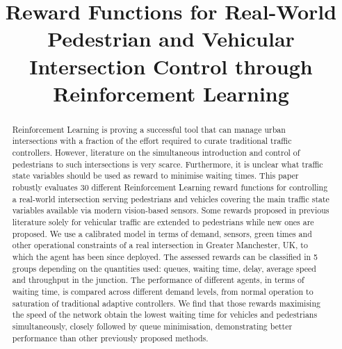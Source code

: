 \documentclass[a4paper, conference]{IEEEtran}
\begin{document}
\title{Reward Functions for Real-World Pedestrian and Vehicular Intersection Control through Reinforcement Learning}

\author{
\and
{}
}

\maketitle

\begin{abstract}
Reinforcement Learning is proving a successful tool that can manage urban intersections with a fraction of the effort required to curate traditional traffic controllers.
However, literature on the simultaneous introduction and control of pedestrians to such intersections is very scarce.
Furthermore, it is unclear what traffic state variables should be used as reward to minimise waiting times.
This paper robustly evaluates 30 different Reinforcement Learning reward functions for controlling a real-world intersection serving pedestrians and vehicles covering the main traffic state variables available via modern vision-based sensors.
Some rewards proposed in previous literature solely for vehicular traffic are extended to pedestrians while new ones are proposed.
We use a calibrated model in terms of demand, sensors, green times and other operational constraints of a real intersection in Greater Manchester, UK, to which the agent has been since deployed.
The assessed rewards can be classified in 5 groups depending on the quantities used: queues, waiting time, delay, average speed and throughput in the junction.
The performance of different agents, in terms of waiting time, is compared across different demand levels, from normal operation to saturation of traditional adaptive controllers.
We find that those rewards maximising the speed of the network obtain the lowest waiting time for vehicles and pedestrians simultaneously, closely followed by queue minimisation, demonstrating better performance than other previously proposed methods.
\end{abstract}
\end{document}
